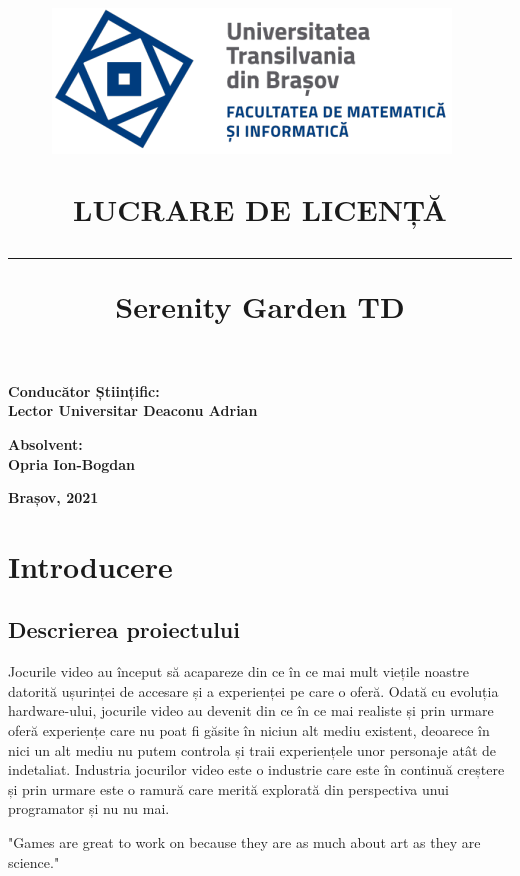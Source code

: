 \documentclass[12pt, a4paper]{article}
\title{%
	\includegraphics[height=0.3\textwidth]{UNITBV2.png}~ 
	\\[1cm]
	\vspace{20mm}
	
	\bf 	LUCRARE DE LICENȚĂ
	\noindent\rule{14cm}{1pt}
	\bf Serenity Garden TD
}
\date{}
\begin{document}
	
	
	
	\maketitle
	\vspace{10mm} %
	\begin{flushleft}
		\bf 	Conducător Științific:
		\bf     \\Lector Universitar Deaconu Adrian
	\end{flushleft}
	
	\begin{flushright}
		\bf Absolvent:
		\bf \\Opria Ion-Bogdan
	\end{flushright}
	
	\vspace{4mm} %
	
	\begin{center}
		\bf Brașov, 2021 
	\end{center}
	
	
	\tableofcontents
	\pagebreak
	
	\section{Introducere}
	
	
	
	
	
	\subsection{Descrierea proiectului}
	
	Jocurile video au început să acapareze din ce în ce mai mult viețile noastre datorită ușurinței de accesare și a experienței pe care o oferă. Odată cu evoluția hardware-ului, jocurile video au devenit din ce în ce mai realiste și prin urmare oferă experiențe care nu poat fi găsite în niciun alt mediu existent, deoarece în nici un alt mediu nu putem controla și traii experiențele unor personaje atât de indetaliat. Industria jocurilor video este o industrie care este în continuă creștere și prin urmare este o ramură care merită explorată din perspectiva unui programator și nu nu mai. 
	\newline
	
	"Games are great to work on because they are as much about art as they are science." \cite{gameProgrammingComplete}
	\newline
	
\end{document}
